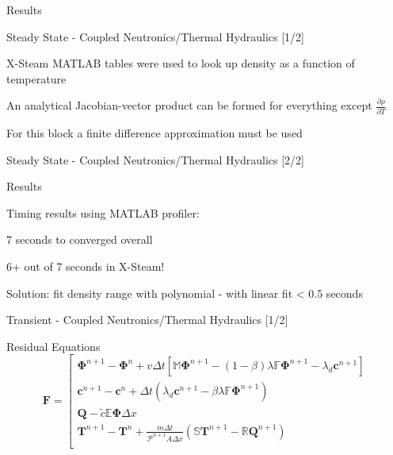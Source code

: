 \documentclass{beamer}
\begin{document}
\begin{section}{Results}
\begin{frame}{Steady State - Coupled Neutronics/Thermal Hydraulics [1/2]}
\begin{customlist}{2ex}{0pt}
    \vfill\item X-Steam MATLAB tables were used to look up density as a function of temperature
    \vfill\item An analytical Jacobian-vector product can be formed for everything except $\frac{\partial\rho}{\partial T}$
    \vfill\item For this block a finite difference approximation must be used
  \end{customlist}
\end{frame}
\begin{frame}{Steady State - Coupled Neutronics/Thermal Hydraulics [2/2]}
  \begin{block}{Results}
    \begin{center}
      \scalebox{0.4}{}
    \end{center}
  \end{block}
  \begin{customlist}{2ex}{0pt}
    \vfill\item \small Timing results using MATLAB profiler:
    \begin{customlist}{2ex}{0pt}
      \vfill\item 7 seconds to converged overall
      \vfill\item 6+ out of 7 seconds in X-Steam!
      \vfill\item Solution: fit density range with polynomial - with linear fit < 0.5 seconds
    \end{customlist}
  \end{customlist}
\end{frame}
\begin{frame}{Transient - Coupled Neutronics/Thermal Hydraulics [1/2]}
  \begin{block}{Residual Equations}
	\[
	    \mathbf{F}=\left[\begin{array}{c}
	    \mathbf{\Phi}^{n+1}-\mathbf{\Phi}^{n}+v\Delta t\left[\mathbb{M}\mathbf{\Phi}^{n+1}-\left(1-\beta\right)\lambda\mathbb{F}\mathbf{\Phi}^{n+1}-\lambda_{d}\mathbf{c}^{n+1}\right]\\
	    \mathbf{c}^{n+1}-\mathbf{c}^{n}+\Delta t\left(\lambda_{d}\mathbf{c}^{n+1}-\beta\lambda\mathbb{F}\mathbf{\Phi}^{n+1}\right)\\
	    \mathbf{Q}-\tilde{c}\mathbb{E}\mathbf{\Phi}\Delta x\\
	    \mathbf{T}^{n+1}-\mathbf{T}^{n}+\frac{\dot{m} \Delta t}{\mathcal{P}^{n+1}A\Delta x}\left(\mathbb{S}\mathbf{T}^{n+1}-\mathbb{R}\mathbf{Q}^{n+1}\right)\\

\end{array}\]
\end{block}
\end{frame}
\end{section}
\end{document}
